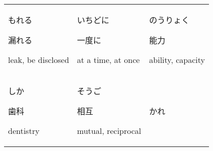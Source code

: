 \documentclass[12pt, a4j, landscape, dvipdfmx]{utarticle}
\begin{document}
    
    \begin{minipage}[t][0pt]{\linewidth }
        \noindent 
        \begin{tabular}{||p{5.5cm}||p{5.5cm}||p{5.5cm}||}
            \hhline{|t:=:t:=:t:=:t|} \rule{0pt}{3ex}
            \hspace*{-.4cm} {\LARGE もれる}\newline
            \rule{0pt}{3ex} \hspace*{.4cm} {\small
            漏れる}\newline \rule{0pt}{3ex} \hspace*{.425cm}
            {\small leak, be disclosed}&\rule{0pt}{3ex}
            \hspace*{-.4cm} {\LARGE いちどに}\newline
            \rule{0pt}{3ex} \hspace*{.4cm} {\small
            一度に}\newline \rule{0pt}{3ex} \hspace*{.425cm}
            {\small at a time, at once}&\rule{0pt}{3ex}
            \hspace*{-.4cm} {\LARGE のうりょく}\newline
            \rule{0pt}{3ex} \hspace*{.4cm} {\small
            能力}\newline \rule{0pt}{3ex} \hspace*{.425cm}
            {\small ability, capacity}\tabularnewline
            \hhline{|:=::=::=:|} \rule{0pt}{3ex}
            \hspace*{-.4cm} {\LARGE しか}\newline
            \rule{0pt}{3ex} \hspace*{.4cm} {\small
            歯科}\newline \rule{0pt}{3ex} \hspace*{.425cm}
            {\small dentistry}&\rule{0pt}{3ex}
            \hspace*{-.4cm} {\LARGE そうご}\newline
            \rule{0pt}{3ex} \hspace*{.4cm} {\small
            相互}\newline \rule{0pt}{3ex} \hspace*{.425cm}
            {\small mutual, reciprocal}&\rule{0pt}{3ex}
            \hspace*{-.4cm} {\LARGE かれ}\newline
            \rule{0pt}{3ex} \hspace*{.4cm} {\small
}
\end{tabular}
\end{minipage}
\end{document}
